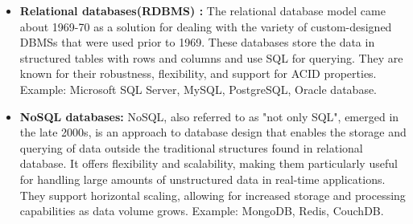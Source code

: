 \begin{itemize}
    \item \textbf{Relational databases(RDBMS) :} The relational database model came about 1969-70 as a solution for dealing with the variety of custom-designed DBMSs that were used prior to 1969. These databases store the data in structured tables with rows and columns and use SQL for querying. They are known for their robustness, flexibility, and support for ACID properties. Example: Microsoft SQL Server, MySQL, PostgreSQL, Oracle database.\cite{editor-2024,foote-2023}
    
    \item \textbf{NoSQL databases:} NoSQL, also referred to as "not only SQL", emerged in the late 2000s, is an approach to database design that enables the storage and querying of data outside the traditional structures found in relational database. It offers flexibility and scalability, making them particularly useful for handling large amounts of unstructured data in real-time applications. They support horizontal scaling, allowing for increased storage and processing capabilities as data volume grows. Example: MongoDB, Redis, CouchDB.\cite{ibm-2024,justacademy_nosql_characteristics}
\end{itemize}

